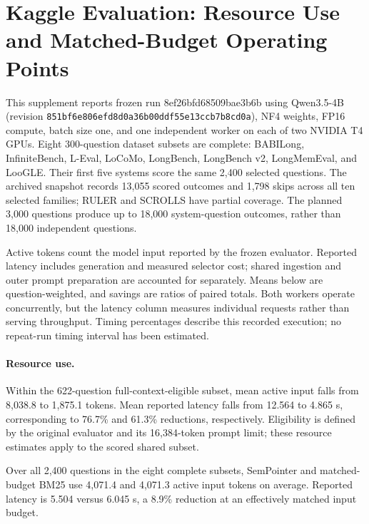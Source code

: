 \section{Kaggle Evaluation: Resource Use and Matched-Budget Operating Points}
This supplement reports frozen run 8ef26bfd68509bae3b6b using Qwen3.5-4B (revision \texttt{851bf6e8\allowbreak{}06efd8d0\allowbreak{}a36b00dd\allowbreak{}f55e13cc\allowbreak{}b7b8cd0a}), NF4 weights, FP16 compute, batch size one, and one independent worker on each of two NVIDIA T4 GPUs. Eight 300-question dataset subsets are complete: BABILong, InfiniteBench, L-Eval, LoCoMo, LongBench, LongBench v2, LongMemEval, and LooGLE. Their first five systems score the same 2,400 selected questions. The archived snapshot records 13,055 scored outcomes and 1,798 skips across all ten selected families; RULER and SCROLLS have partial coverage. The planned 3,000 questions produce up to 18,000 system-question outcomes, rather than 18,000 independent questions.


Active tokens count the model input reported by the frozen evaluator. Reported latency includes generation and measured selector cost; shared ingestion and outer prompt preparation are accounted for separately. Means below are question-weighted, and savings are ratios of paired totals. Both workers operate concurrently, but the latency column measures individual requests rather than serving throughput. Timing percentages describe this recorded execution; no repeat-run timing interval has been estimated.


\paragraph{Resource use.}
Within the 622-question full-context-eligible subset, mean active input falls from 8,038.8 to 1,875.1 tokens. Mean reported latency falls from 12.564 to 4.865 s, corresponding to 76.7\% and 61.3\% reductions, respectively. Eligibility is defined by the original evaluator and its 16,384-token prompt limit; these resource estimates apply to the scored shared subset.


Over all 2,400 questions in the eight complete subsets, SemPointer and matched-budget BM25 use 4,071.4 and 4,071.3 active input tokens on average. Reported latency is 5.504 versus 6.045 s, a 8.9\% reduction at an effectively matched input budget.


